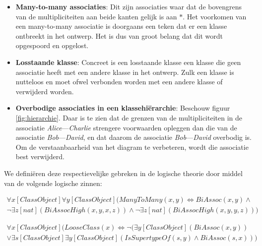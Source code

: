 \begin{itemize}
	\item \textbf{Many-to-many associaties}: Dit zijn associaties waar dat de bovengrens van de multipliciteiten aan beide kanten gelijk is aan $*$. Het voorkomen van een many-to-many associatie is doorgaans een teken dat er een klasse ontbreekt in het ontwerp. Het is dus van groot belang dat dit wordt opgespoord en opgelost.
	
	\item \textbf{Losstaande klasse}: Concreet is een losstaande klasse een klasse die geen associatie heeft met een andere klasse in het ontwerp. Zulk een klasse is nutteloos en moet ofwel verbonden worden met een andere klasse of verwijderd worden.
	
	\item \textbf{Overbodige associaties in een klassehi\"erarchie}\cite{Balaban2015}: Beschouw figuur \ref{fig:hierarchie}. Daar is te zien dat de grenzen van de multipliciteiten in de associatie \textit{Alice}---\textit{Charlie} strengere voorwaarden opleggen dan die van de associatie \textit{Bob}---\textit{David}, en dat daarom de associatie \textit{Bob}---\textit{David} overbodig is. Om de verstaanbaarheid van het diagram te verbeteren, wordt die associatie best verwijderd.
\end{itemize}

We defini\"eren deze respectievelijke gebreken in de logische theorie door middel van de volgende logische zinnen:

\begin{align*}
	\forall{x}[ClassObject]\forall{y}[ClassObject](ManyToMany(x,y) \Leftrightarrow BiAssoc(x,y) \land \\ \lnot\exists{z}[nat](BiAssocHigh(x,y,x,z)) \land \lnot\exists{z}[nat](BiAssocHigh(x,y,y,z)))
\end{align*}

\begin{align*}
	\forall{x}[ClassObject](LooseClass(x) \Leftrightarrow \lnot(\exists{y}[ClassObject](BiAssoc(x,y)) \\ \lor \exists{s}[ClassObject]\exists{y}[ClassObject](IsSupertypeOf(s,y) \land BiAssoc(s,x)))
\end{align*}


